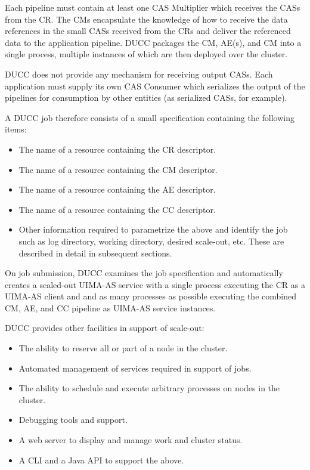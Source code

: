     Each pipeline must contain at least one CAS Multiplier which receives the CASs from the CR.  The
    CMs encapsulate the knowledge of how to receive the data references in the small CASs received
    from the CRs and deliver the referenced data to the application pipeline.  DUCC packages the CM,
    AE(s), and CM into a single process, multiple instances of which are then deployed over the
    cluster.

    DUCC does not provide any mechanism for receiving output CASs.  Each application must
    supply its own CAS Consumer which serializes the output of the pipelines for 
    consumption by other entities (as serialized CASs, for example).

    A DUCC job therefore consists of a small specification containing the following items:
    
    \begin{itemize}
      \item The name of a resource containing the CR descriptor.
      \item The name of a resource containing the CM descriptor.
      \item The name of a resource containing the AE descriptor.
      \item The name of a resource containing the CC descriptor.
      \item Other information required to parametrize the above and identify the job
        such as log directory, working directory, desired scale-out, etc.  These are
        described in detail in subsequent sections.
    \end{itemize}

    On job submission, DUCC examines the job specification and automatically creates a scaled-out
    UIMA-AS service with a single process executing the CR as a UIMA-AS client and and as many
    processes as possible executing the combined CM, AE, and CC pipeline as UIMA-AS service
    instances.

    DUCC provides other facilities in support of scale-out:
    \begin{itemize}
      \item The ability to reserve all or part of a node in the cluster.
      \item Automated management of services required in support of jobs.
      \item The ability to schedule and execute arbitrary processes on nodes in the
        cluster.
      \item Debugging tools and support.
      \item A web server to display and manage work and cluster status.
      \item A CLI and a Java API to support the above.
    \end{itemize}
    
